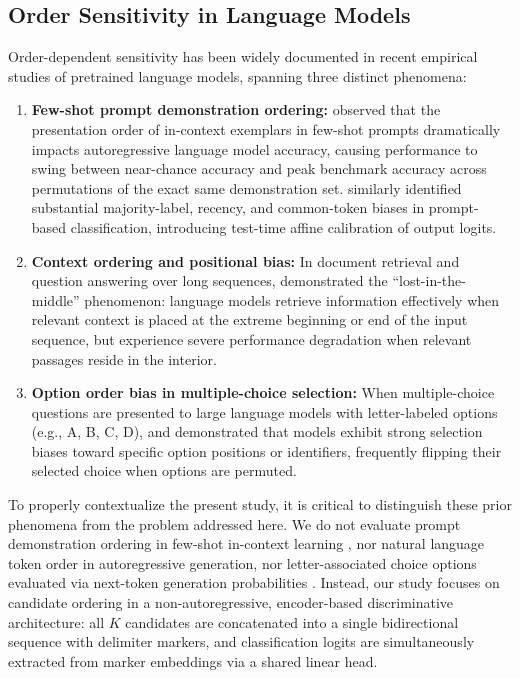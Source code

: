 \documentclass[10pt]{article}
\begin{document}
\subsection{Order Sensitivity in Language Models}
Order-dependent sensitivity has been widely documented in recent empirical studies of pretrained language models, spanning three distinct phenomena:
\begin{enumerate}
    \item \textbf{Few-shot prompt demonstration ordering:} \citet{lu2022fantastically} observed that the presentation order of in-context exemplars in few-shot prompts dramatically impacts autoregressive language model accuracy, causing performance to swing between near-chance accuracy and peak benchmark accuracy across permutations of the exact same demonstration set. \citet{zhao2021calibrate} similarly identified substantial majority-label, recency, and common-token biases in prompt-based classification, introducing test-time affine calibration of output logits.
    \item \textbf{Context ordering and positional bias:} In document retrieval and question answering over long sequences, \citet{liu2024lost} demonstrated the ``lost-in-the-middle'' phenomenon: language models retrieve information effectively when relevant context is placed at the extreme beginning or end of the input sequence, but experience severe performance degradation when relevant passages reside in the interior.
    \item \textbf{Option order bias in multiple-choice selection:} When multiple-choice questions are presented to large language models with letter-labeled options (e.g., A, B, C, D), \citet{pezeshkpour2024large} and \citet{zheng2024large} demonstrated that models exhibit strong selection biases toward specific option positions or identifiers, frequently flipping their selected choice when options are permuted.
\end{enumerate}

To properly contextualize the present study, it is critical to distinguish these prior phenomena from the problem addressed here. We do not evaluate prompt demonstration ordering in few-shot in-context learning \citep{lu2022fantastically}, nor natural language token order in autoregressive generation, nor letter-associated choice options evaluated via next-token generation probabilities \citep{pezeshkpour2024large, zheng2024large}. Instead, our study focuses on candidate ordering in a non-autoregressive, encoder-based discriminative architecture: all $K$ candidates are concatenated into a single bidirectional sequence with delimiter markers, and classification logits are simultaneously extracted from marker embeddings via a shared linear head.
\end{document}
